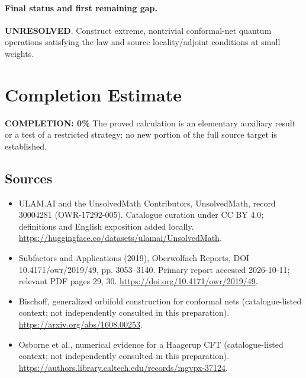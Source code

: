 \documentclass[11pt]{article}
\begin{document}
\paragraph{Final status and first remaining gap.}
\textbf{UNRESOLVED}. Construct extreme, nontrivial conformal-net quantum operations satisfying the law and source locality/adjoint conditions at small weights.

\section{Completion Estimate}
\noindent\textbf{COMPLETION: 0\%}
The proved calculation is an elementary auxiliary result or a test of a restricted strategy; no new portion of the full source target is established.

\subsection{Sources}
\begin{itemize}
\item[\hypertarget{source:30004281:1}{S1}] ULAM.AI and the UnsolvedMath Contributors, UnsolvedMath, record 30004281 (OWR-17292-005). Catalogue curation under CC BY 4.0; definitions and English exposition added locally.
\url{https://huggingface.co/datasets/ulamai/UnsolvedMath}.
\item[\hypertarget{source:30004281:2}{S2}] Subfactors and Applications (2019), Oberwolfach Reports, DOI 10.4171/owr/2019/49, pp. 3053--3140. Primary report accessed 2026-10-11; relevant PDF pages 29, 30.
\url{https://doi.org/10.4171/owr/2019/49}.
\item[\hypertarget{source:30004281:3}{S3}] Bischoff, generalized orbifold construction for conformal nets (catalogue-listed context; not independently consulted in this preparation).
\url{https://arxiv.org/abs/1608.00253}.
\item[\hypertarget{source:30004281:4}{S4}] Osborne et al., numerical evidence for a Haagerup CFT (catalogue-listed context; not independently consulted in this preparation).
\url{https://authors.library.caltech.edu/records/mgvpx-37124}.
\end{itemize}
\label{end:30004281}
\end{document}
